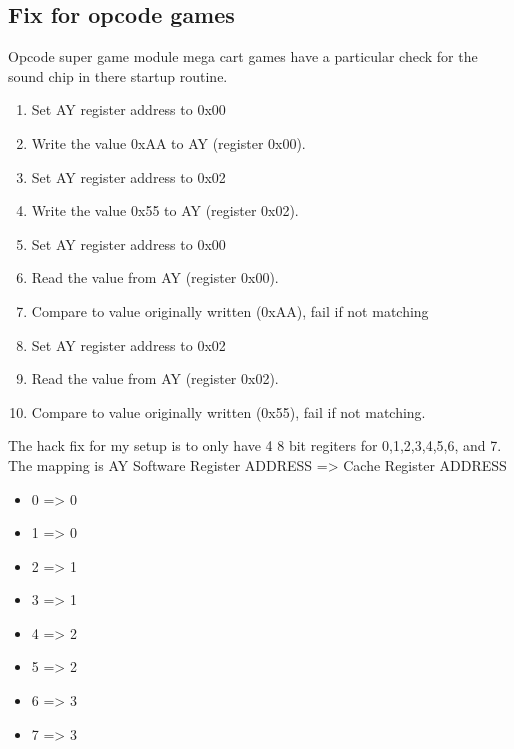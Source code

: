 \subsection{Fix for opcode games}

Opcode super game module mega cart games have a particular check for the sound chip in there startup routine.

\begin{enumerate}
  \item Set AY register address to 0x00
  \item Write the value 0xAA to AY (register 0x00).
  \item Set AY register address to 0x02
  \item Write the value 0x55 to AY (register 0x02).
  \item Set AY register address to 0x00
  \item Read the value from AY (register 0x00).
  \item Compare to value originally written (0xAA), fail if not matching
  \item Set AY register address to 0x02
  \item Read the value from AY (register 0x02).
  \item Compare to value originally written (0x55), fail if not matching.
\end{enumerate}

The hack fix for my setup is to only have 4 8 bit regiters for 0,1,2,3,4,5,6, and 7. The mapping is
AY Software Register ADDRESS => Cache Register ADDRESS

\begin{itemize}
  \item 0 => 0
  \item 1 => 0
  \item 2 => 1
  \item 3 => 1
  \item 4 => 2
  \item 5 => 2
  \item 6 => 3
  \item 7 => 3
\end{itemize}
